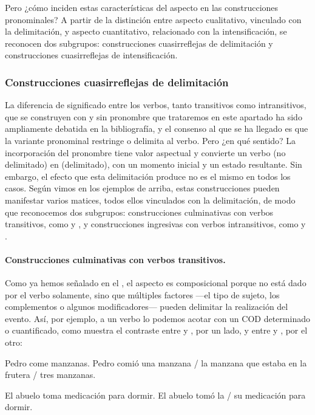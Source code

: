 Pero ¿cómo inciden estas características del aspecto en las construcciones
pronominales? A partir de la distinción entre aspecto cualitativo, vinculado con
la delimitación, y aspecto cuantitativo, relacionado con la intensificación, se
reconocen dos subgrupos: construcciones cuasirreflejas de delimitación y
construcciones cuasirreflejas de intensificación.

\subsubsection{Construcciones cuasirreflejas de delimitación}\label{sec:10-delimitacion}

La diferencia de significado entre los verbos, tanto transitivos como
intransitivos, que se construyen con y sin pronombre que trataremos en este
apartado ha sido ampliamente debatida en la bibliografía, y el consenso al que
se ha llegado es que la variante pronominal restringe o delimita al verbo. Pero
¿en qué sentido? La incorporación del pronombre tiene valor aspectual y convierte
un verbo  (no delimitado) en  (delimitado), con
un momento inicial y un estado resultante. Sin embargo, el efecto que esta
delimitación produce no es el mismo en todos los casos. Según vimos en los
ejemplos de arriba, estas construcciones pueden manifestar varios matices, todos
ellos vinculados con la delimitación, de modo que reconocemos dos subgrupos:
construcciones culminativas con verbos transitivos, como  y
, y construcciones
ingresivas con verbos intransitivos, como  y
.

\paragraph{Construcciones culminativas con verbos transitivos.} Como ya hemos
señalado en el , el aspecto
es composicional porque no está dado por el verbo solamente, sino que múltiples
factores ---el tipo de sujeto, los complementos o algunos modificadores--- pueden
delimitar la realización del evento. Así, por ejemplo, a un verbo lo podemos
acotar con un COD determinado o cuantificado, como muestra el contraste entre
 y , por un lado, y entre
 y , por el otro:

\begin{exe}
  \ex
    \begin{xlist}
      \ex\label{ex:10-manzanas-a} Pedro come manzanas.
      \ex\label{ex:10-manzanas-b} Pedro comió una manzana / la manzana que estaba
          en la frutera / tres manzanas.
    \end{xlist}
  \ex
    \begin{xlist}
      \ex\label{ex:10-abuelo-a} El abuelo toma medicación para dormir.
      \ex\label{ex:10-abuelo-b} El abuelo tomó la / su medicación para dormir.
    \end{xlist}
\end{exe}

